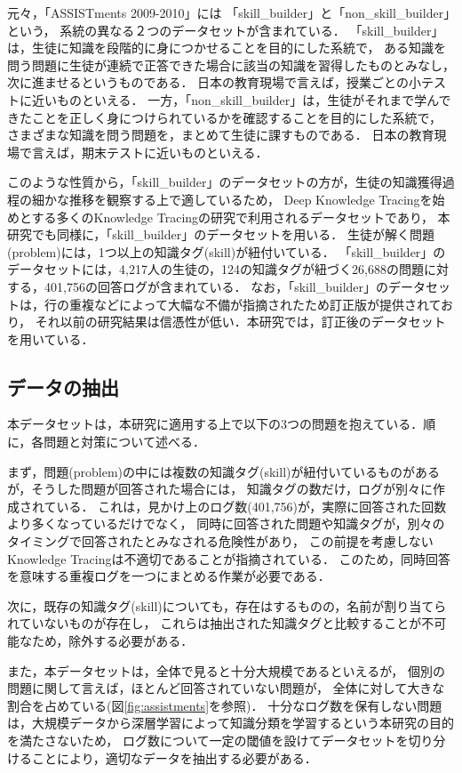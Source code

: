 元々，「ASSISTments 2009-2010」には
「skill\_builder」と「non\_skill\_builder」という，
系統の異なる２つのデータセットが含まれている．
「skill\_builder」は，生徒に知識を段階的に身につかせることを目的にした系統で，
ある知識を問う問題に生徒が連続で正答できた場合に該当の知識を習得したものとみなし，次に進ませるというものである．
日本の教育現場で言えば，授業ごとの小テストに近いものといえる．
一方，「non\_skill\_builder」は，生徒がそれまで学んできたことを正しく身につけられているかを確認することを目的にした系統で，
さまざまな知識を問う問題を，まとめて生徒に課すものである．
日本の教育現場で言えば，期末テストに近いものといえる．

このような性質から，「skill\_builder」のデータセットの方が，生徒の知識獲得過程の細かな推移を観察する上で適しているため，
Deep Knowledge Tracing\cite{piech2015deep}を始めとする多くのKnowledge Tracingの研究で利用されるデータセットであり，
本研究でも同様に，「skill\_builder」のデータセットを用いる．
生徒が解く問題(problem)には，1つ以上の知識タグ(skill)が紐付いている．
「skill\_builder」のデータセットには，4,217人の生徒の，124の知識タグが紐づく26,688の問題に対する，401,756の回答ログが含まれている．
なお，「skill\_builder」のデータセットは，行の重複などによって大幅な不備が指摘されたため訂正版が提供されており，
それ以前の研究結果は信憑性が低い．本研究では，訂正後のデータセットを用いている．


\subsection{データの抽出}
本データセットは，本研究に適用する上で以下の3つの問題を抱えている．順に，各問題と対策について述べる．

まず，問題(problem)の中には複数の知識タグ(skill)が紐付いているものがあるが，そうした問題が回答された場合には，
知識タグの数だけ，ログが別々に作成されている．
これは，見かけ上のログ数(401,756)が，実際に回答された回数より多くなっているだけでなく，
同時に回答された問題や知識タグが，別々のタイミングで回答されたとみなされる危険性があり，
この前提を考慮しないKnowledge Tracingは不適切であることが指摘されている\cite{xiong2016going}．
このため，同時回答を意味する重複ログを一つにまとめる作業が必要である．

次に，既存の知識タグ(skill)についても，存在はするものの，名前が割り当てられていないものが存在し，
これらは抽出された知識タグと比較することが不可能なため，除外する必要がある．


また，本データセットは，全体で見ると十分大規模であるといえるが，
個別の問題に関して言えば，ほとんど回答されていない問題が，
全体に対して大きな割合を占めている(図\ref{fig:assistments}を参照)．
十分なログ数を保有しない問題は，大規模データから深層学習によって知識分類を学習するという本研究の目的を満たさないため，
ログ数について一定の閾値を設けてデータセットを切り分けることにより，適切なデータを抽出する必要がある．



